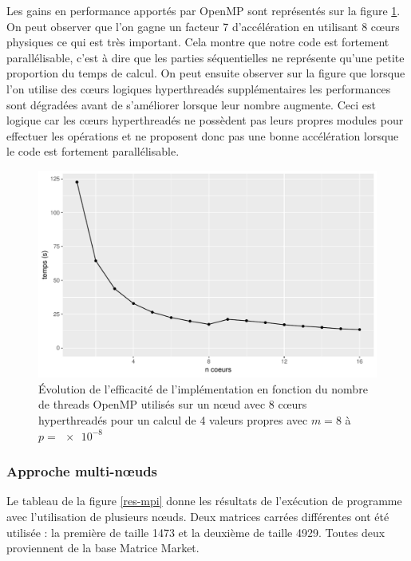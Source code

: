 \documentclass[11pt,a4paper]{article}
\begin{document}
			Les gains en performance apportés par OpenMP sont représentés sur la figure \ref{fig:omp_perf}. On peut observer que l'on gagne un facteur 7 d'accélération en utilisant 8 cœurs physiques ce qui est très important. Cela montre que notre code est fortement parallélisable, c'est à dire que les parties séquentielles ne représente qu'une petite proportion du temps de calcul. On peut ensuite observer sur la figure que lorsque l'on utilise des cœurs logiques hyperthreadés supplémentaires les performances sont dégradées avant de s'améliorer lorsque leur nombre augmente. Ceci est logique car les cœurs hyperthreadés ne possèdent pas leurs propres modules pour effectuer les opérations et ne proposent donc pas une bonne accélération lorsque le code est fortement parallélisable.

			\begin{figure}
				\includegraphics[width=\linewidth]{plots/omp_perf.pdf}
				\caption{Évolution de l'efficacité de l'implémentation en fonction du nombre de threads OpenMP utilisés sur un nœud avec 8 cœurs hyperthreadés pour un calcul de 4 valeurs propres avec $m = 8$ à $p=\SI{e-8}{}$ \label{fig:omp_perf}}
			\end{figure}

		\subsubsection{Approche multi-n\oe{}uds}

			Le tableau de la figure \ref{res-mpi} donne les résultats de l'exécution de programme avec l'utilisation de plusieurs n\oe{}uds. Deux matrices carrées différentes ont été utilisée : la première de taille 1473 et la deuxième de taille 4929. Toutes deux proviennent de la base Matrice Market.
		
\end{document}
